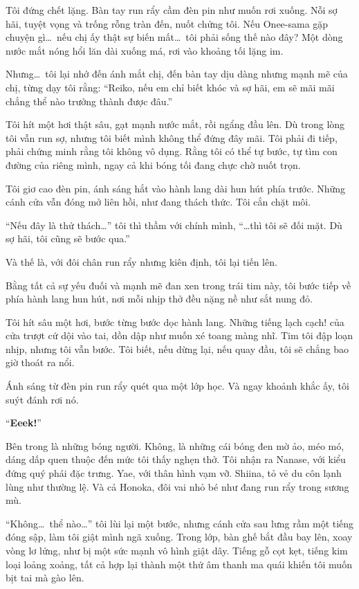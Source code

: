 \documentclass[../main.tex]{subfiles}
\begin{document}
Tôi đứng chết lặng. Bàn tay run rẩy cầm đèn pin như muốn rơi xuống. Nỗi sợ hãi, tuyệt vọng và trống rỗng tràn đến, nuốt chửng tôi. Nếu Onee-sama gặp chuyện gì\dots\ nếu chị ấy thật sự biến mất\dots\ tôi phải sống thế nào đây? Một dòng nước mắt nóng hổi lăn dài xuống má, rơi vào khoảng tối lặng im.

Nhưng\dots\ tôi lại nhớ đến ánh mắt chị, đến bàn tay dịu dàng nhưng mạnh mẽ của chị, từng dạy tôi rằng: ``Reiko, nếu em chỉ biết khóc và sợ hãi, em sẽ mãi mãi chẳng thể nào trưởng thành được đâu.''

Tôi hít một hơi thật sâu, gạt mạnh nước mắt, rồi ngẩng đầu lên. Dù trong lòng tôi vẫn run sợ, nhưng tôi biết mình không thể đứng đây mãi. Tôi phải đi tiếp, phải chứng minh rằng tôi không vô dụng. Rằng tôi có thể tự bước, tự tìm con đường của riêng mình, ngay cả khi bóng tối đang chực chờ nuốt trọn.

Tôi giơ cao đèn pin, ánh sáng hắt vào hành lang dài hun hút phía trước. Những cánh cửa vẫn đóng mở liên hồi, như đang thách thức. Tôi cắn chặt môi.

``Nếu đây là thử thách\dots'' tôi thì thầm với chính mình, ``\dots thì tôi sẽ đối mặt. Dù sợ hãi, tôi cũng sẽ bước qua.''

Và thế là, với đôi chân run rẩy nhưng kiên định, tôi lại tiến lên.

Bằng tất cả sự yếu đuối và mạnh mẽ đan xen trong trái tim này, tôi bước tiếp về phía hành lang hun hút, nơi mỗi nhịp thở đều nặng nề như sắt nung đỏ.

Tôi hít sâu một hơi, bước từng bước dọc hành lang. Những tiếng lạch cạch! của cửa trượt cứ dội vào tai, dồn dập như muốn xé toang màng nhĩ. Tim tôi đập loạn nhịp, nhưng tôi vẫn bước. Tôi biết, nếu dừng lại, nếu quay đầu, tôi sẽ chẳng bao giờ thoát ra nổi.

Ánh sáng từ đèn pin run rẩy quét qua một lớp học. Và ngay khoảnh khắc ấy, tôi suýt đánh rơi nó.

``\textbf{Eeek!}''

Bên trong là những bóng người. Không, là những cái bóng đen mờ ảo, méo mó, dáng dấp quen thuộc đến mức tôi thấy nghẹn thở. Tôi nhận ra Nanase, với kiểu đứng quý phái đặc trưng. Yae, với thân hình vạm vỡ. Shiina, tỏ vẻ du côn lạnh lùng như thường lệ. Và cả Honoka, đôi vai nhỏ bé như đang run rẩy trong sương mù.

``Không\dots\ thể nào\dots'' tôi lùi lại một bước, nhưng cánh cửa sau lưng rầm một tiếng đóng sập, làm tôi giật mình ngã xuống. Trong lớp, bàn ghế bắt đầu bay lên, xoay vòng lơ lửng, như bị một sức mạnh vô hình giật dây. Tiếng gỗ cọt kẹt, tiếng kim loại loảng xoảng, tất cả hợp lại thành một thứ âm thanh ma quái khiến tôi muốn bịt tai mà gào lên.
\end{document}
